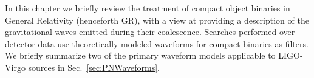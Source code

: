 
\newcommand{\cd}{\nabla}
\newcommand{\pd}{\partial}
\newcommand{\Reals}{\mathcal{R}}
\newcommand{\defeq}{\mathrel{\mathop:}=}
\newcommand{\hbarr}{\bar{h}}
\newcommand{\Tbar}{\bar{T}}
\newcommand{\Quad}{\mathcal{Q}}
\newcommand{\vecx}{\mathbf{x}}
\newcommand{\vecr}{\mathbf{r}}

In this chapter we briefly review the treatment of compact object
binaries in General Relativity (henceforth GR), with a view at providing a 
description of the gravitational waves emitted during their coalescence. 
Searches performed over 
detector data use theoretically modeled waveforms for compact binaries as 
filters. We briefly summarize two of the primary waveform models applicable
to LIGO-Virgo sources in Sec.~\ref{sec:PNWaveforms}.


